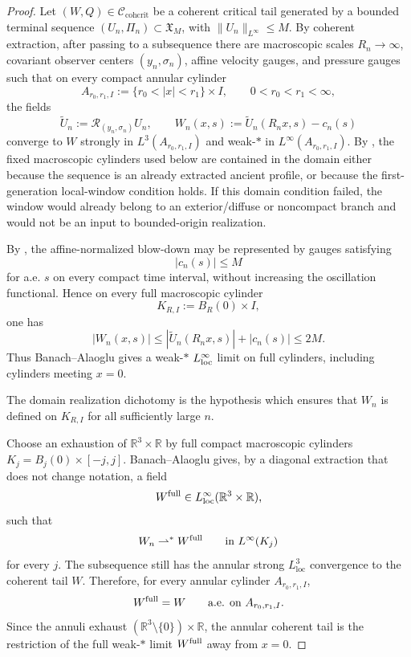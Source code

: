 \documentclass[11pt]{amsart}
\numberwithin{equation}{section}
\theoremstyle{plain}
\theoremstyle{definition}
\theoremstyle{remark}
\newcommand{\loc}{\mathrm{loc}}
\newcommand{\calR}{\mathcal R}
\newcommand{\Ccohcrit}{\mathcal C_{\mathrm{cohcrit}}}
\begin{document}
\begin{proof}
Let \((W,Q)\in\Ccohcrit\) be a coherent critical tail generated by a bounded
terminal sequence \((U_n,\Pi_n)\subset\mathfrak X_M\), with
\(\|U_n\|_{L^\infty}\le M\).  By coherent extraction, after passing to a
subsequence there are macroscopic scales \(R_n\to\infty\), covariant observer
centers \((y_n,\sigma_n)\), affine velocity gauges, and pressure gauges such
that on every compact annular cylinder
\[
   A_{r_0,r_1,I}:=\{r_0<|x|<r_1\}\times I,
   \qquad 0<r_0<r_1<\infty,
\]
the fields
\[
   \widetilde U_n:=\calR_{(y_n,\sigma_n)}U_n,
   \qquad
   W_n(x,s):=\widetilde U_n(R_nx,s)-c_n(s)
\]
converge to \(W\) strongly in \(L^3(A_{r_0,r_1,I})\) and weak-\(*\) in
\(L^\infty(A_{r_0,r_1,I})\).
By , the fixed
macroscopic cylinders used below are contained in the domain either because the
sequence is an already extracted ancient profile, or because the first-generation local-window
condition holds.  If this domain condition failed, the window would already
belong to an exterior/diffuse or noncompact branch and would not be an input to
bounded-origin realization.

By , the affine-normalized blow-down
may be represented by gauges satisfying
\[
   |c_n(s)|\le M
\]
for a.e. \(s\) on every compact time interval, without increasing the
oscillation functional.  Hence on every full macroscopic cylinder
\[
   K_{R,I}:=B_R(0)\times I,
\]
one has
\[
   |W_n(x,s)|
   \le |\widetilde U_n(R_nx,s)|+|c_n(s)|
   \le 2M .
\]
Thus Banach--Alaoglu gives a weak-\(*\) \(L^\infty_{\rm loc}\) limit on full
cylinders, including cylinders meeting \(x=0\).

The domain realization dichotomy
 is the hypothesis
which ensures that \(W_n\) is defined on \(K_{R,I}\) for all sufficiently large
\(n\).

Choose an exhaustion of \(\mathbb R^3\times\mathbb R\) by full compact
macroscopic cylinders \(K_j=B_j(0)\times[-j,j]\).  Banach--Alaoglu gives, by a
diagonal extraction that does not change notation, a field
\[
   W^{\rm full}\in L^\infty_{\loc}(\mathbb R^3\times\mathbb R),
\]
such that
\[
   W_n\rightharpoonup^\ast W^{\rm full}
   \qquad\hbox{in }L^\infty(K_j)
\]
for every \(j\).  The subsequence still has the annular strong
\(L^3_{\loc}\) convergence to the coherent tail \(W\).  Therefore, for every
annular cylinder \(A_{r_0,r_1,I}\),
\[
   W^{\rm full}=W
   \qquad\hbox{a.e. on }A_{r_0,r_1,I}.
\]
Since the annuli exhaust
\((\mathbb R^3\setminus\{0\})\times\mathbb R\), the annular coherent tail is the
restriction of the full weak-\(*\) limit \(W^{\rm full}\) away from \(x=0\).


\end{proof}
\end{document}
